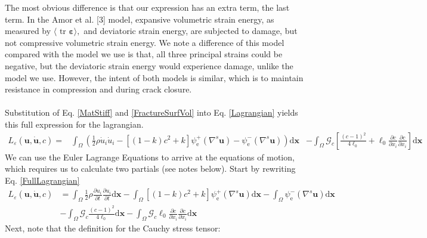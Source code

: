 \documentclass[12pt,3p]{article}
\numberwithin{equation}{section}
\begin{document}
The most obvious difference is that our expression has an extra term, the last term. In the Amor et al. [3] model, expansive volumetric strain energy, as measured by $\langle\text { tr } \boldsymbol{\varepsilon}\rangle,$ and deviatoric strain energy, are subjected to damage, but not compressive volumetric strain energy. We note a difference of this model compared with the model we use is that, all three principal strains could be negative, but the deviatoric strain energy would experience damage, unlike the model we use. However, the intent of both models is similar, which is to maintain resistance in compression and during crack closure. \\ \\
Substitution of Eq. \ref{MatStiff} and \ref{FractureSurfVol} into Eq. \ref{Lagrangian} yields this full expression for the lagrangian.  
\begin{equation}\label{FullLagrangian}
\begin{aligned}
L_{\varepsilon}(\boldsymbol{u}, \dot{\boldsymbol{u}}, c)=& \int_{\Omega}\left(\frac{1}{2} \rho \dot{u}_{i} \dot{u}_{i}-\left[(1-k) c^{2}+k\right] \psi_{\mathrm{e}}^{+}\left(\nabla^{s} \boldsymbol{u}\right)-\psi_{\mathrm{e}}^{-}\left(\nabla^{s} \boldsymbol{u}\right)\right) \mathrm{d} \boldsymbol{x} 
&-\int_{\Omega} \mathcal{G}_{c}\left[\frac{(c-1)^{2}}{4 \ell_{0}}+\ell_{0} \frac{\partial c}{\partial x_{i}} \frac{\partial c}{\partial x_{i}}\right] \mathrm{d} \boldsymbol{x}
\end{aligned}
\end{equation}
We can use the Euler Lagrange Equations to arrive at the equations of motion, which requires us to calculate two partials (see notes below). Start by rewriting Eq. \ref{FullLagrangian}
\begin{align*}
L_{\varepsilon}(\boldsymbol{u}, \dot{\boldsymbol{u}}, c) &= 
\int_{\Omega} \frac{1}{2} \rho \frac{\partial u_i}{\partial t} \frac{\partial u_i}{\partial t} \mathrm{d} \boldsymbol{x} 
- \int_{\Omega} \left[(1-k) c^{2} + k \right] \psi_{\mathrm{e}}^{+} \left(\nabla^{s} \boldsymbol{u} \right) \mathrm{d} \boldsymbol{x} 
- \int_{\Omega} \psi_{\mathrm{e}}^{-} \left(\nabla^{s} \boldsymbol{u}\right) \mathrm{d} \mathbf{x} \\
&-\int_{\Omega} \mathcal{G}_{c} \frac{(c-1)^{2}}{4 \ell_{0}} \mathrm{d} \boldsymbol{x} 
- \int_{\Omega} \mathcal{G}_{c} \ell_{0} \frac{\partial c}{\partial x_{i}} \frac{\partial c}{\partial x_{i}} \mathrm{d} \boldsymbol{x}
\end{align*}
Next, note that the definition for the Cauchy stress tensor: 
\end{document}
